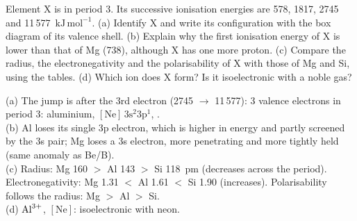 Element X is in period 3. Its successive ionisation energies are 578, 1817, 2745 and
11\,577~$\mathrm{kJ\,mol^{-1}}$. (a) Identify X and write its configuration with the box diagram of its
valence shell. (b) Explain why the first ionisation energy of X is lower than that of Mg (738), although
X has one more proton. (c) Compare the radius, the electronegativity and the polarisability of X with
those of Mg and Si, using the tables. (d) Which ion does X form? Is it isoelectronic with a noble gas?
\begin{solution}
(a) The jump is after the 3rd electron (2745 $\to$ 11\,577): 3 valence electrons in period 3: aluminium,
$[\mathrm{Ne}]\,3\mathrm s^2 3\mathrm p^1$, \;.\\
(b) Al loses its single 3p electron, which is higher in energy and partly screened by the 3s pair;
Mg loses a 3s electron, more penetrating and more tightly held (same anomaly as Be/B).\\
(c) Radius: Mg 160 $>$ Al 143 $>$ Si 118~pm (decreases across the period). Electronegativity:
Mg 1.31 $<$ Al 1.61 $<$ Si 1.90 (increases). Polarisability follows the radius: Mg $>$ Al $>$ Si.\\
(d) $\ce{Al^3+}$, $[\mathrm{Ne}]$: isoelectronic with neon.
\end{solution}
